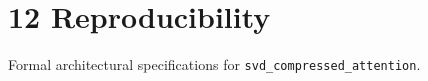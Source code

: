 \section{12 Reproducibility}

Formal architectural specifications for \texttt{svd_compressed_attention}.
